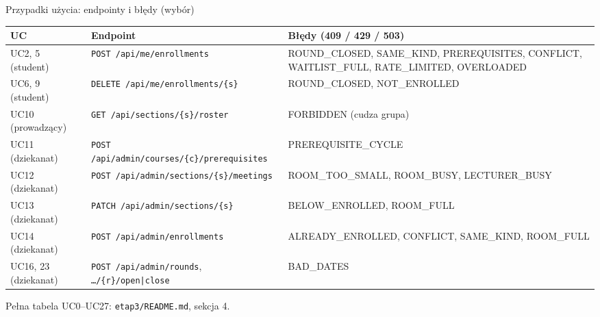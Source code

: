 \documentclass[aspectratio=169,11pt]{beamer}
\begin{document}
\begin{frame}{Przypadki użycia: endpointy i błędy (wybór)}
  \scriptsize
  \begin{tabularx}{\textwidth}{@{}>{\raggedright}p{1.9cm}>{\raggedright}p{5.3cm}L@{}}
    \toprule
    \textbf{UC} & \textbf{Endpoint} & \textbf{Błędy (409 / 429 / 503)} \\
    \midrule
    UC2, 5 {\tiny(student)} & \texttt{POST /api/me/enrollments} & ROUND\_CLOSED, SAME\_KIND, PREREQUISITES, CONFLICT, WAITLIST\_FULL, RATE\_LIMITED, OVERLOADED \\
    UC6, 9 {\tiny(student)} & \texttt{DELETE /api/me/enrollments/\{s\}} & ROUND\_CLOSED, NOT\_ENROLLED \\
    UC10 {\tiny(prowadzący)} & \texttt{GET /api/sections/\{s\}/roster} & FORBIDDEN (cudza grupa) \\
    UC11 {\tiny(dziekanat)} & \texttt{POST /api/admin/courses/\{c\}/prerequisites} & PREREQUISITE\_CYCLE \\
    UC12 {\tiny(dziekanat)} & \texttt{POST /api/admin/sections/\{s\}/meetings} & ROOM\_TOO\_SMALL, ROOM\_BUSY, LECTURER\_BUSY \\
    UC13 {\tiny(dziekanat)} & \texttt{PATCH /api/admin/sections/\{s\}} & BELOW\_ENROLLED, ROOM\_FULL \\
    UC14 {\tiny(dziekanat)} & \texttt{POST /api/admin/enrollments} & ALREADY\_ENROLLED, CONFLICT, SAME\_KIND, ROOM\_FULL \\
    UC16, 23 {\tiny(dziekanat)} & \texttt{POST /api/admin/rounds}, \texttt{…/\{r\}/open|close} & BAD\_DATES \\
    \bottomrule
  \end{tabularx}

  \footnotesize Pełna tabela UC0--UC27: \texttt{etap3/README.md}, sekcja 4.
\end{frame}
\end{document}
